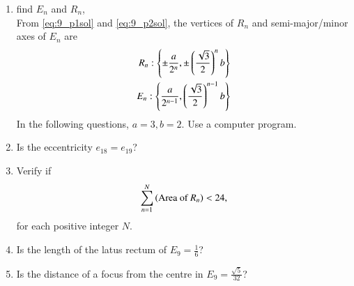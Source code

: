 \documentclass[journal,12pt,twocolumn]{IEEEtran}
\renewcommand\thesection{\arabic{section}}
\begin{document}
\begin{enumerate}[label=\thesection.\arabic*
,ref=\thesection.\theenumi]
\solution From \eqref{eq:9_p1sol} and \eqref{eq:9_p2sol}, the  semi-major/minor axes of $E_2$ are
\begin{align}
E_2: \brak{ \frac{a}{2},\frac{\sqrt{3}}{2}b}
\end{align}
%
\item find $E_n$ and $R_n$,
\\
\solution From \eqref{eq:9_p1sol} and \eqref{eq:9_p2sol}, the vertices of $R_n$ and semi-major/minor axes of $E_n$ are
\begin{align}
R_n: \left\{\pm \frac{a}{2^{n}},\pm\left(\frac{\sqrt{3}}{2}\right)^nb\right\}
\nonumber \\
E_n: \left\{ \frac{a}{2^{n-1}},\left(\frac{\sqrt{3}}{2}\right)^{n-1}b\right\}
\end{align}
In the following questions, $a=3,b=2$. Use a computer program.
\item Is the eccentricity $e_18=e_19$?
\item Verify if 
\begin{align}
\sum_{n=1}^{N}\left(\text{Area of } R_n\right) < 24, 
\end{align}
for each positive integer $N$.
\item Is the length of the latus rectum of $E_9 = \frac{1}{6}$?
\item Is the distance of a focus from the centre in $E_9 = \frac{\sqrt{5}}{32}$?
\end{enumerate}
\end{document}
